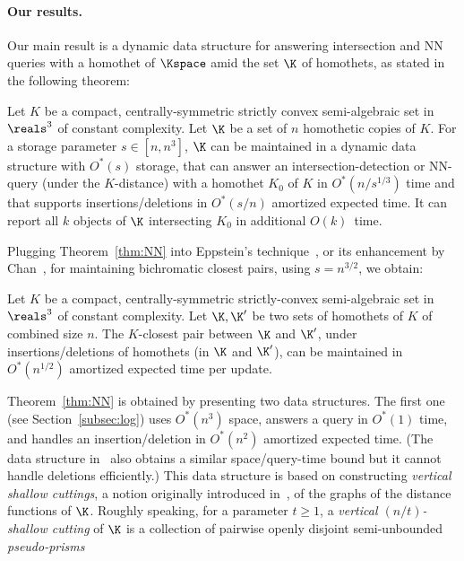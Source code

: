 \paragraph{Our results.} 
Our main result is a dynamic data structure for answering intersection 
and NN queries with a homothet of $\Kspace$ amid the set $\K$ of homothets, as stated in the following theorem:
\fi
%
\begin{theorem} \label{thm:NN}
Let $K$ be a compact, centrally-symmetric strictly convex semi-algebraic set
in $\reals^3$ of constant complexity.  Let $\K$ be a set of $n$ homothetic 
copies of $K$. For a storage parameter $s \in [n,n^3]$, $\K$ can be maintained in a dynamic data 
	structure with $O^*(s)$ storage, that can answer an intersection-detection or NN-query (under the $K$-distance) 
	with a homothet $K_0$ of $K$ 
	in $O^*(n/s^{1/3})$ time and that supports insertions/deletions in $O^*(s/n)$ 
	amortized expected time. It can report all $k$ objects of $\K$ intersecting $K_0$ in additional $O(k)$~time.
\end{theorem}
Plugging Theorem~\ref{thm:NN} into Eppstein's technique~\cite{Epp}, or its enhancement by Chan~\cite{Chan:bcp},
for maintaining bichromatic closest pairs, using $s=n^{3/2}$, we obtain:
\begin{corollary}
	\label{cor:bcp}
Let $K$ be a compact, centrally-symmetric strictly-convex semi-algebraic set
in $\reals^3$ of constant complexity. Let $\K, \K'$ be two sets of homothets of $K$
of combined size $n$. The $K$-closest pair between $\K$ and $\K'$,
under insertions/deletions of homothets (in $\K$ and $\K'$), can be 
maintained in $O^*(n^{1/2})$ amortized expected time per update.
\end{corollary}
%
Theorem~\ref{thm:NN} is obtained by presenting two data structures. The first 
one (see Section~\ref{subsec:log})
uses $O^*(n^3)$ space, answers a query in $O^*(1)$ time, and handles an insertion/deletion in $O^*(n^2)$ amortized expected time. 
(The data structure in~\cite{AES:vd} also obtains a similar space/query-time bound but it cannot handle deletions efficiently.)
This data structure is based on constructing \emph{vertical shallow cuttings}, a notion originally introduced in~\cite{CT16,Chan:le},  of the graphs of the distance functions of $\K$. Roughly speaking,
for a parameter $t\ge 1$, a \emph{vertical $(n/t)$-shallow 
cutting} of $\K$ is a collection of pairwise openly disjoint semi-unbounded \emph{pseudo-prisms} 
